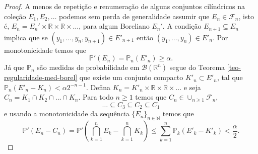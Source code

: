 \begin{proof}
A menos de repetição e renumeração de alguns conjuntos 
cilíndricos na coleção $E_1,E_2,\ldots $ 
podemos sem perda de generalidade assumir que 
$E_n\in\mathcal{F}_n$, isto é, 
$E_n=E_n'\times\mathbb{R}\times\mathbb{R}\times\ldots$,
para algum Boreliano $E_n'$. 
A condição $E_{n+1}\subseteq E_{n}$ implica que se
$(y_1,\ldots, y_n,y_{n+1})\in E'_{n+1}$ então 
$(y_1,\ldots, y_n)\in E'_{n}$. 
Por monotonicidade temos que 
\[
\mathbb{P}'(E_n) = \mathbb{P}_{n}(E'_n)\geq \alpha.
\]
Já que $\mathbb{P}_n$ são medidas de probabilidade em 
$\mathscr{B}(\mathbb{R}^n)$ segue do 
Teorema \ref{teo-regularidade-med-borel} que existe
um conjunto compacto $K'_n\subset E'_n$, tal que 
$\mathbb{P}_{n}(E'_n-K_n)<\alpha 2^{-n-1}$.
Defina $K_n = K'_n\times \mathbb{R}\times\mathbb{R}\times\ldots$
e seja $C_n = K_1\cap K_2\cap\ldots\cap K_n$. Para todo $n\geq 1$ 
temos que $C_n\in \cup_{n\geq 1}\mathcal{F}_n$,  
\[
\ldots\subseteq C_3\subseteq C_2\subseteq C_1
\]
e usando a monotonicidade da sequência $\{E_n\}_{n\in\mathbb{N}}$ 
temos que 
\[
\mathbb{P}'(E_n-C_n)
=
\mathbb{P}'\left( \bigcap_{k=1}^n E_k- \bigcap_{k=1}^n K_k \right)
\leq
\sum_{k=1}^{n} \mathbb{P}_{k}(E'_k-K'_k)
<
\frac{\alpha}{2}.
\]
\end{proof}